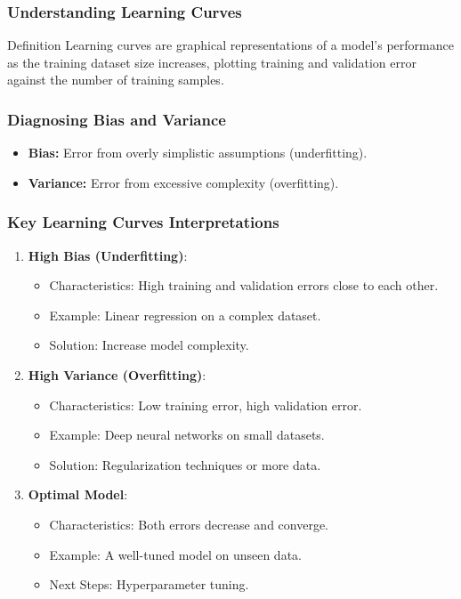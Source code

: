 \documentclass[aspectratio=169]{beamer}
\begin{document}
\begin{frame}
    \frametitle{Understanding Learning Curves}
    \begin{block}{Definition}
    Learning curves are graphical representations of a model's performance as the training dataset size increases, plotting training and validation error against the number of training samples.
    \end{block}
\end{frame}

\begin{frame}
    \frametitle{Diagnosing Bias and Variance}
    \begin{itemize}
        \item \textbf{Bias:} Error from overly simplistic assumptions (underfitting).
        \item \textbf{Variance:} Error from excessive complexity (overfitting).
    \end{itemize}
\end{frame}

\begin{frame}
    \frametitle{Key Learning Curves Interpretations}
    \begin{enumerate}
        \item \textbf{High Bias (Underfitting)}:
        \begin{itemize}
            \item Characteristics: High training and validation errors close to each other.
            \item Example: Linear regression on a complex dataset.
            \item Solution: Increase model complexity.
        \end{itemize}
        
        \item \textbf{High Variance (Overfitting)}:
        \begin{itemize}
            \item Characteristics: Low training error, high validation error.
            \item Example: Deep neural networks on small datasets.
            \item Solution: Regularization techniques or more data.
        \end{itemize}
        
        \item \textbf{Optimal Model}:
        \begin{itemize}
            \item Characteristics: Both errors decrease and converge.
            \item Example: A well-tuned model on unseen data.
            \item Next Steps: Hyperparameter tuning.
        \end{itemize}
    \end{enumerate}
\end{frame}
\end{document}
